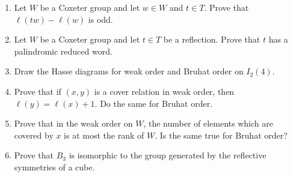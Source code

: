 \documentclass{article}
\numberwithin{equation}{section}
\theoremstyle{remark}
\theoremstyle{definition}
\begin{document}
\begin{enumerate}
		
		\item Let $W$ be a Coxeter group and let $w\in W$ and $t\in T$. Prove that $\ell(tw)-\ell(w)$ is odd.
		
		
		\item Let $W$ be a Coxeter group and let $t\in T$ be a reflection. Prove that $t$ has a palindromic reduced word.
		
		\item Draw the Hasse diagrams for weak order and Bruhat order on $I_2(4)$.
		
		\item Prove that if $(x,y)$ is a cover relation in weak order, then $\ell(y) = \ell(x) + 1$. Do the same for Bruhat order.
		
		\item Prove that in the weak order on $W$, the number of elements which are covered by $x$ is at most the rank of $W$. Is the same true for Bruhat order?
		
		\item Prove that $B_3$ is isomorphic to the group generated by the reflective symmetries of a cube.
		
	\end{enumerate}
	
	
\end{document}
